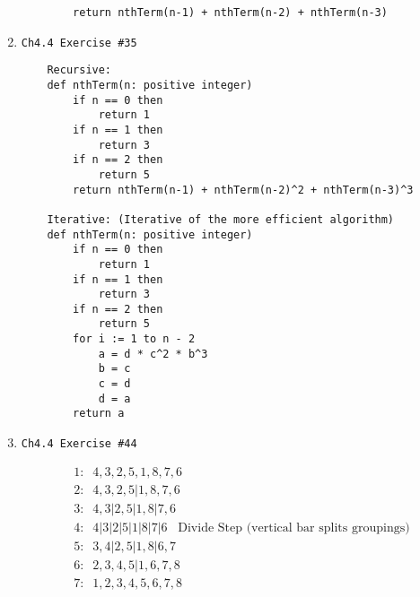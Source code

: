 \documentclass[11pt]{article}
\begin{document}
\begin{enumerate}
\begin{verbatim}
        return nthTerm(n-1) + nthTerm(n-2) + nthTerm(n-3)
        \end{verbatim}   
    
    \item \begin{verbatim}Ch4.4 Exercise #35\end{verbatim}
        \begin{verbatim}
    Recursive:
    def nthTerm(n: positive integer)
        if n == 0 then
            return 1
        if n == 1 then
            return 3
        if n == 2 then
            return 5
        return nthTerm(n-1) + nthTerm(n-2)^2 + nthTerm(n-3)^3

    Iterative: (Iterative of the more efficient algorithm)
    def nthTerm(n: positive integer)
        if n == 0 then
            return 1
        if n == 1 then
            return 3
        if n == 2 then
            return 5
        for i := 1 to n - 2
            a = d * c^2 * b^3
            b = c
            c = d
            d = a
        return a
        \end{verbatim}   
    
    \item \begin{verbatim}Ch4.4 Exercise #44\end{verbatim}
        \begin{align*}
            & 1:\;\; 4, 3, 2, 5, 1, 8, 7, 6 \\
            & 2:\;\; 4, 3, 2, 5 | 1, 8, 7, 6 \\
            & 3:\;\; 4, 3| 2, 5 | 1, 8 | 7, 6 \\
            & 4:\;\; 4| 3| 2| 5 | 1| 8 | 7| 6 \;\;\; \text{Divide Step (vertical bar splits groupings)}\\
            & 5:\;\; 3, 4| 2, 5 | 1, 8 | 6, 7 \\
            & 6:\;\; 2, 3, 4, 5 | 1, 6, 7, 8 \\
            & 7:\;\; 1, 2, 3, 4, 5, 6, 7, 8 \\
        \end{align*}
        
    \end{enumerate}
\end{document}
